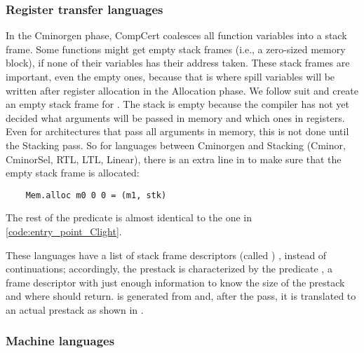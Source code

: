 
\subsubsection{Register transfer languages}
In the Cminorgen phase, CompCert coalesces  all function variables into a stack frame. Some functions might get empty stack frames (i.e., a zero-sized memory block), if none of their variables has their address taken. These stack frames are important, even the empty ones, because that is where spill variables will be written after register allocation in the Allocation phase. We follow suit and create an empty stack frame for . The stack is empty because the compiler has not yet decided what arguments will be passed in memory and which ones in registers. Even for architectures that pass all arguments in memory, this is not done until the Stacking pass. So for languages between Cminorgen and Stacking (Cminor, CminorSel, RTL, LTL, Linear), there is an extra line in  to make sure that the empty stack frame is allocated:
\begin{lstlisting}
	Mem.alloc m0 0 0 = (m1, stk) \end{lstlisting}
The rest of the predicate is almost identical to the one in \autoref{code:entry_point_Clight}.

These languages have a list of stack frame descriptors (called ) , instead of continuations; accordingly, the prestack is characterized by the predicate , a frame descriptor with just enough information to know the size of the prestack and where \main should return.  is generated from  and, after the  pass, it is translated to an actual prestack as shown in \label{fig:Kstop_compile}.

\subsubsection{Machine languages}


